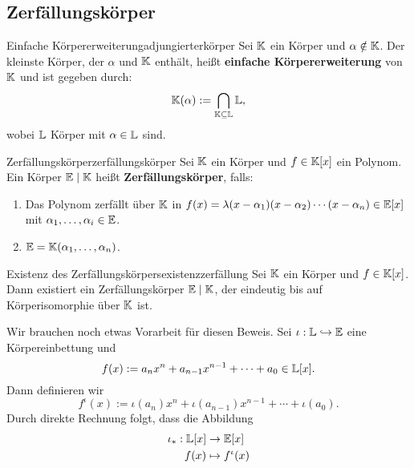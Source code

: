 \subsection{Zerfällungskörper}
\label{subsec:zerfaellungskoerper}

\begin{definition}{Einfache Körpererweiterung}{adjungierterkörper}
Sei $\mathbb{K}$ ein Körper und $\alpha \notin \mathbb{K}$. Der kleinste Körper, der $\alpha$ und $\mathbb{K}$ enthält, heißt \textbf{einfache Körpererweiterung} von $\mathbb{K}$ und ist gegeben durch:
\begin{equation}
\mathbb{K}(\alpha) := \bigcap_{\mathbb{K} \subseteq \mathbb{L}} \mathbb{L},
\end{equation}
wobei $\mathbb{L}$ Körper mit $\alpha \in \mathbb{L}$ sind.
\end{definition}

\begin{definition}{Zerfällungskörper}{zerfällungskörper}
Sei $\mathbb{K}$ ein Körper und $f \in \mathbb{K}[x]$ ein Polynom. Ein Körper $\mathbb{E} \mid \mathbb{K}$ heißt \textbf{Zerfällungskörper}, falls:
\begin{enumerate}
\item Das Polynom zerfällt über $\mathbb{K}$ in $f(x) = \lambda (x-\alpha_1)(x-\alpha_2)\cdots (x-\alpha_n) \in \mathbb{E}[x]$ mit $\alpha_1, \dots, \alpha_i \in \mathbb{E}$.
\item $\mathbb{E} = \mathbb{K}(\alpha_1, \dots, \alpha_n)$.
\end{enumerate}
\end{definition}
\begin{satz}{Existenz des Zerfällungskörpers}{existenzzerfällung}
Sei $\mathbb{K}$ ein Körper und $f \in \mathbb{K}[x]$. Dann existiert ein Zerfällungskörper $\mathbb{E} \mid \mathbb{K}$, der eindeutig bis auf Körperisomorphie über $\mathbb{K}$ ist.
\end{satz}
Wir brauchen noch etwas Vorarbeit für diesen Beweis. Sei $\iota: \mathbb{L} \hookrightarrow \mathbb{E}$ eine Körpereinbettung und 
\begin{equation}
f(x):= a_nx^n +a_{n-1}x^{n-1} + \cdots + a_0 \in \mathbb{L}[x].
\end{equation}
Dann definieren wir
\begin{equation}
f^\iota (x):= \iota(a_n)x^n + \iota(a_{n-1})x^{n-1} + \cdots + \iota(a_0).
\end{equation}
Durch direkte Rechnung folgt, dass die Abbildung
\begin{equation}
\begin{split}
\iota_\ast: \mathbb{L}[x] &\to \mathbb{E}[x]\\
f(x) &\mapsto f^\iota(x)
\end{split}
\end{equation}
